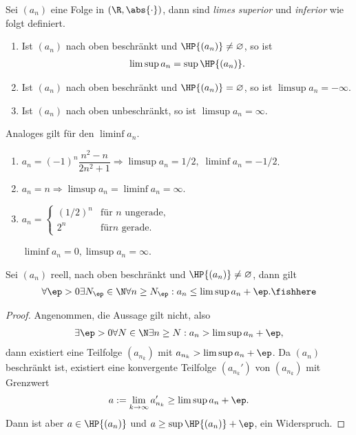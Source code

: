 \begin{defn}
\label{defn:1.8}
Sei $(a_n)$ eine Folge in $(\R,\abs{\cdot})$, dann sind \emph{limes
superior} und \emph{inferior} wie folgt definiert.
\begin{enumerate}
  \item Ist $(a_n)$ nach oben beschränkt und $\HP{(a_n)}\neq\varnothing$, so
  ist
  \begin{align*}
  \limsup a_n = \sup \HP{(a_n)}.
  \end{align*}
  \item Ist $(a_n)$ nach oben beschränkt und $\HP{(a_n)}=\varnothing$, so
  ist $\limsup a_n = -\infty$.
  \item Ist $(a_n)$ nach oben unbeschränkt, so ist $\limsup a_n =
  \infty$.
\end{enumerate}
Analoges gilt für den $\liminf a_n$. \fishhere 
\end{defn}

\begin{bsp}
\label{bsp:1.9}
\begin{enumerate}
\item $a_n = (-1)^n \dfrac{n^2-n}{2n^2+1} \Rightarrow \limsup a_n = 1/2,\;
\liminf a_n = -1/2$.
\item $a_n = n \Rightarrow \limsup a_n = \liminf a_n = \infty$.
\item $a_n = \begin{cases}(1/2)^n & \text{für $n$ ungerade},\\ 2^n & \text{für
$n$ gerade}.\end{cases}$

$\liminf a_n = 0, \limsup a_n = \infty$.\bsphere
\end{enumerate}
\end{bsp}

\begin{prop}
\label{prop:1.10}
\label{limsupsatz}
Sei $(a_n)$ reell, nach oben beschränkt und
$\HP{(a_n)}\neq\varnothing$, dann gilt
\begin{align*}
\forall \ep>0 \exists N_\ep \in\N \forall n\ge N_\ep : a_n \le \limsup a_n +
\ep.\fishhere
\end{align*}
\end{prop}
\begin{proof}
Angenommen, die Aussage gilt nicht, also
\begin{align*}
\exists \ep > 0 \forall N \in\N\exists n\ge N : a_n > \limsup a_n + \ep,
\end{align*}
dann existiert eine Teilfolge $(a_{n_k})$ mit $a_{n_k} > \limsup a_n + \ep$.
Da $(a_n)$ beschränkt ist, existiert eine konvergente Teilfolge $(a_{n_k}')$ von
$(a_{n_k})$ mit Grenzwert
\begin{align*}
a:=\lim_{k\to\infty} a_{n_k}' \ge \limsup a_n + \ep.
\end{align*}
Dann ist aber $a\in\HP{(a_n)}$ und $a\ge \sup\HP{(a_n)} + \ep$, ein
Widerspruch.\qedhere
\end{proof}

